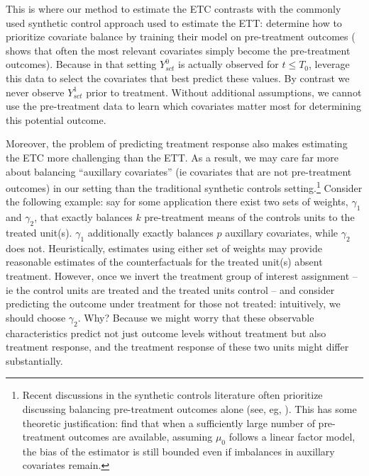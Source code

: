 \documentclass[12pt]{article}
\begin{document}
This is where our method to estimate the ETC contrasts with the commonly used synthetic control approach used to estimate the ETT: \cite{abadie2010synthetic} determine how to prioritize covariate balance by training their model on pre-treatment outcomes (\cite{kaul2015synthetic} shows that often the most relevant covariates simply become the pre-treatment outcomes). Because in that setting $Y^0_{sct}$ is actually observed for $t \le T_0$, \cite{abadie2010synthetic} leverage this data to select the covariates that best predict these values. By contrast we never observe $Y^1_{sct}$ prior to treatment. Without additional assumptions, we cannot use the pre-treatment data to learn which covariates matter most for determining this potential outcome.

Moreover, the problem of predicting treatment response also makes estimating the ETC more challenging than the ETT. As a result, we may care far more about balancing ``auxillary covariates'' (ie covariates that are not pre-treatment outcomes) in our setting than the traditional synthetic controls setting.\footnote{Recent discussions in the synthetic controls literature often prioritize discussing balancing pre-treatment outcomes alone (see, eg, \cite{doudchenko2016balancing}). This has some theoretic justification: \cite{botosaru2019role} find that when a sufficiently large number of pre-treatment outcomes are available, assuming $\mu_0$ follows a linear factor model, the bias of the estimator is still bounded even if imbalances in auxillary covariates remain.} Consider the following example: say for some application there exist two sets of weights, $\gamma_1$ and $\gamma_2$, that exactly balances $k$ pre-treatment means of the controls units to the treated unit(s). $\gamma_1$ additionally exactly balances $p$ auxillary covariates, while $\gamma_2$ does not. Heuristically, estimates using either set of weights may provide reasonable estimates of the counterfactuals for the treated unit(s) absent treatment. However, once we invert the treatment group of interest assignment -- ie the control units are treated and the treated units control -- and consider predicting the outcome under treatment for those not treated: intuitively, we should choose $\gamma_2$. Why? Because we might worry that these observable characteristics predict not just outcome levels without treatment but also treatment response, and the treatment response of these two units might differ substantially. 
\end{document}
